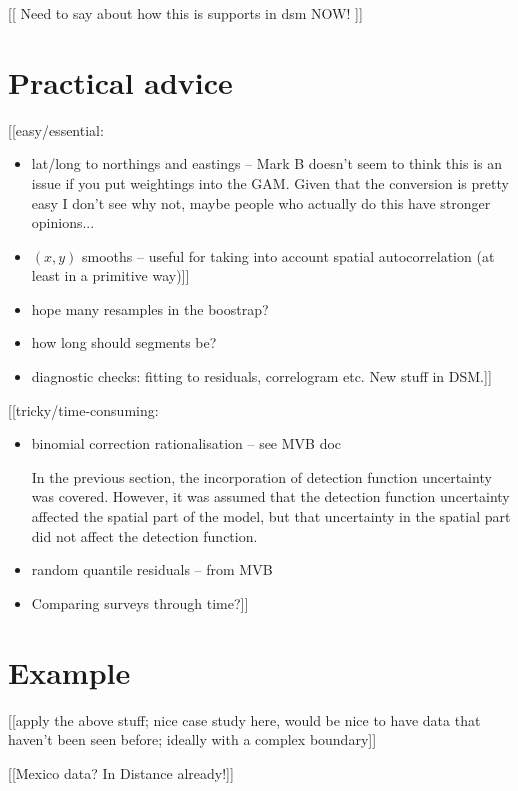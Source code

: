 \documentclass[a4paper,12pt]{article}
\begin{document}
[[ Need to say about how this is supports in dsm NOW! ]]


\section*{Practical advice}
\label{s:practical}

[[easy/essential:
\begin{itemize}
\item lat/long to northings and eastings -- Mark B doesn't seem to think this is an issue if you put weightings into the GAM. Given that the conversion is pretty easy I don't see why not, maybe people who actually do this have stronger opinions...
\item $(x,y)$ smooths -- useful for taking into account spatial autocorrelation (at least in a primitive way)]]
\item hope many resamples in the boostrap?
\item how long should segments be?
\item diagnostic checks: fitting to residuals, correlogram etc. New stuff in DSM.]]
\end{itemize}
[[tricky/time-consuming:
\begin{itemize}
\item binomial correction rationalisation -- see MVB doc

In the previous section, the incorporation of detection function uncertainty was covered. However, it was assumed that the detection function uncertainty affected the spatial part of the model, but that uncertainty in the spatial part did not affect the detection function.

\item random quantile residuals -- from MVB
\item Comparing surveys through time?]]
 \end{itemize}






\section*{Example}
\label{s:data}

[[apply the above stuff; nice case study here, would be nice to have data that haven't been seen before; ideally with a complex boundary]]

[[Mexico data? In Distance already!]]
\end{document}
